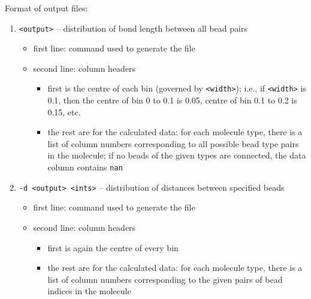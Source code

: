 \noindent
Format of output files:
\begin{enumerate}[nosep,leftmargin=20pt]
  \item \texttt{<output>} -- distribution of bond length between all bead
    pairs
    \begin{itemize}[nosep,leftmargin=5pt]
      \item first line: command used to generate the file
      \item second line: column headers
        \begin{itemize}[nosep,leftmargin=10pt]
          \item first is the centre of each bin (governed by
            \texttt{<width>}); i.e., if \texttt{<width>} is 0.1,
            then the centre of bin 0 to 0.1 is 0.05, centre of bin 0.1 to
            0.2 is 0.15, etc.
          \item the rest are for the calculated data: for each molecule type,
            there is a list of column numbers corresponding to all
            possible bead type pairs in the molecule; if no beads of the
            given types are connected, the data column contains \texttt{nan}
        \end{itemize}
    \end{itemize}
  \item \texttt{-d <output> <ints>} -- distribution of distances between
    specified beads
    \begin{itemize}[nosep,leftmargin=5pt]
      \item first line: command used to generate the file
      \item second line: column headers
        \begin{itemize}[nosep,leftmargin=10pt]
          \item first is again the centre of every bin
          \item the rest are for the calculated data: for each molecule type,
            there is a list of column numbers corresponding to the given
            pairs of bead indices in the molecule
        \end{itemize}
    \end{itemize}
\end{enumerate}
